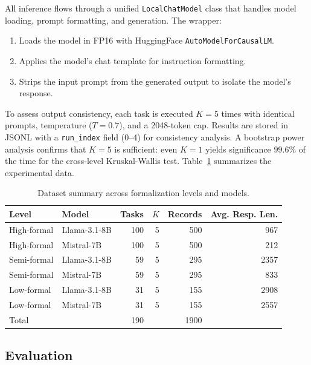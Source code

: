 \documentclass[runningheads]{llncs}
\begin{document}
All inference flows through a unified \texttt{LocalChatModel} class that handles model loading, prompt formatting, and generation. The wrapper:

\begin{enumerate}[noitemsep]
  \item Loads the model in FP16 with HuggingFace \texttt{AutoModelForCausalLM}.
  \item Applies the model's chat template for instruction formatting.
  \item Strips the input prompt from the generated output to isolate the model's response.
\end{enumerate}

To assess output consistency, each task is executed $K\!=\!5$ times with identical prompts, temperature ($T\!=\!0.7$), and a 2048-token cap. Results are stored in JSONL with a \texttt{run\_index} field (0--4) for consistency analysis. A bootstrap power analysis confirms that $K\!=\!5$ is sufficient: even $K\!=\!1$ yields significance $99.6\%$ of the time for the cross-level Kruskal-Wallis test. Table~\ref{tab:dataset} summarizes the experimental data.

\begin{table}[ht]
\centering
\caption{Dataset summary across formalization levels and models.}
\label{tab:dataset}
\setlength{\tabcolsep}{5pt}
\begin{tabular}{llrrrr}
\toprule
Level & Model & Tasks & $K$ & Records & Avg. Resp. Len. \\
\midrule
High-formal & Llama-3.1-8B   & 100 & 5 & 500 & 967 \\
High-formal & Mistral-7B     & 100 & 5 & 500 & 212 \\
Semi-formal & Llama-3.1-8B   &  59 & 5 & 295 & 2357 \\
Semi-formal & Mistral-7B     &  59 & 5 & 295 & 833 \\
Low-formal  & Llama-3.1-8B   &  31 & 5 & 155 & 2908 \\
Low-formal  & Mistral-7B     &  31 & 5 & 155 & 2557 \\
\midrule
\multicolumn{2}{l}{Total} & 190 & & 1900 & \\
\bottomrule
\end{tabular}
\end{table}


\subsection{Evaluation}
\label{sec:metrics}
\end{document}
